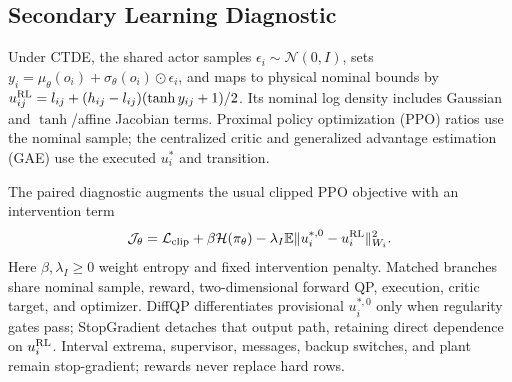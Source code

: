 



\subsection{Secondary Learning Diagnostic}
Under CTDE, the shared actor samples $\epsilon_i\sim\mathcal N(0,I)$, sets $y_i=\mu_\theta(o_i)+\sigma_\theta(o_i)\odot\epsilon_i$, and maps to physical nominal bounds by $u_{ij}^{\rm RL}=l_{ij}+(h_{ij}-l_{ij})(\tanh y_{ij}+1)/2$. Its nominal log density includes Gaussian and $\tanh$/affine Jacobian terms. Proximal policy optimization (PPO) ratios use the nominal sample; the centralized critic and generalized advantage estimation (GAE) use the executed $u_i^*$ and transition.

The paired diagnostic augments the usual clipped PPO objective with an intervention term
\begin{equation}\label{eq:actorloss}
\mathcal J_\theta=\mathcal L_{\rm clip}+\beta\mathcal H(\pi_\theta)
-\lambda_I\mathbb E\|u_i^{*,0}-u_i^{\rm RL}\|_{W_i}^{2}.
\end{equation}
Here $\beta,\lambda_I\ge0$ weight entropy and fixed intervention penalty. Matched branches share nominal sample, reward, two-dimensional forward QP, execution, critic target, and optimizer. DiffQP differentiates provisional $u_i^{*,0}$ only when regularity gates pass; StopGradient detaches that output path, retaining direct dependence on $u_i^{\rm RL}$. Interval extrema, supervisor, messages, backup switches, and plant remain stop-gradient; rewards never replace hard rows.

